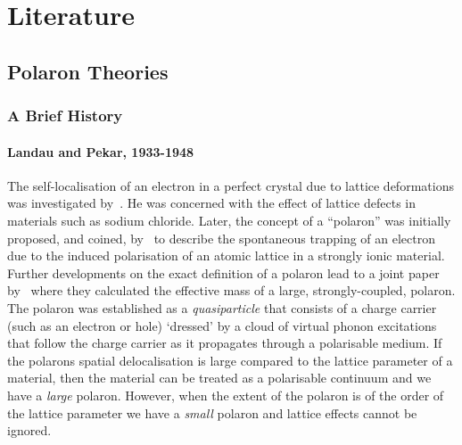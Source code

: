 \chapter{Literature}
\label{chap:second}



\section{Polaron Theories}
\label{sec:2-1}

\subsection{A Brief History}
\label{subsec:2-1-1}

\subsubsection{Landau and Pekar, 1933-1948}
\label{subsubsec:2-1-1-1}

The self-localisation of an electron in a perfect crystal due to lattice deformations was investigated by~\cite{landau_motion_1933}. He was concerned with the effect of lattice defects in materials such as sodium chloride. Later, the concept of a ``polaron'' was initially proposed, and coined, by~\cite{pekar_local_1946, pekar_notitle_1946, pekar_notitle_1947} to describe the spontaneous trapping of an electron due to the induced polarisation of an atomic lattice in a strongly ionic material. Further developments on the exact definition of a polaron lead to a joint paper by~\cite{pekar_effective_1948} where they calculated the effective mass of a large,  strongly-coupled, polaron. The polaron was established as a \emph{quasiparticle} that consists of a charge carrier (such as an electron or hole) `dressed' by a cloud of virtual phonon excitations that follow the charge carrier as it propagates through a polarisable medium. If the polarons spatial delocalisation is large compared to the lattice parameter of a material, then the material can be treated as a polarisable continuum and we have a \emph{large} polaron. However, when the extent of the polaron is of the order of the lattice parameter we have a \emph{small} polaron and lattice effects cannot be ignored.

